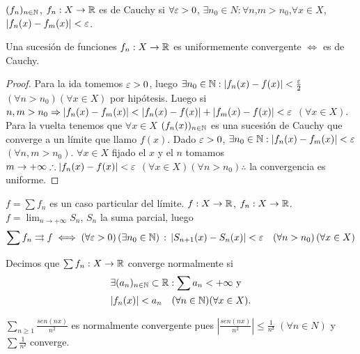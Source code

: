 \begin{definition}
  $(f_n)_{n \in \mathbb{N}}$, $f_n: X \to \mathbb{R}$ es de Cauchy si $\forall \varepsilon > 0$, $\exists n_0 \in N : \forall n$,$m > n_0$,$\forall x \in X$, $|f_n(x) - f_m(x)| < \varepsilon$.
\end{definition}

\clearpage

\begin{theorem}
  Una sucesión de funciones $f_n : X \to \mathbb{R}$ es uniformemente convergente $\iff$ es de Cauchy.
  \begin{proof}
    Para la ida tomemos $\varepsilon > 0$, luego $\exists n_0 \in \mathbb{N} : |f_n(x) - f(x)| < \frac{\varepsilon}{2}$ $(\forall n > n_0)(\forall x \in X)$ por hipótesis. Luego si $n, m > n_0 \Rightarrow |f_n(x) - f_m(x)| < |f_n(x) - f(x)| + |f_m(x) - f(x)| < \varepsilon$ $(\forall x \in X)$. \\
    Para la vuelta tenemos que $\forall x \in X$ $(f_n(x))_{n \in \mathbb{N}}$ es una sucesión de Cauchy que converge a un límite que llamo $f(x)$. Dado $\varepsilon > 0$, $\exists n_0 \in \mathbb{N} : |f_n(x) - f_m(x)| < \varepsilon$ $(\forall n, m > n_0)$. $\forall x \in X$ fijado el $x$ y el $n$ tomamos $m \to +\infty \therefore |f_n(x) - f(x)| < \varepsilon$ $(\forall x \in X)(\forall n > n_0) \therefore$ la convergencia es uniforme.
  \end{proof}
\end{theorem}

$f = \sum f_n$ es un caso particular del límite.
$f : X \to \mathbb{R}$, $f_n: X \to \mathbb{R}$. $f = \lim_{n \to +\infty} S_n$, $S_n$ la suma parcial, luego
\begin{align*}
  \sum f_n \rightrightarrows f \iff (\forall \varepsilon > 0) \, (\exists n_0 \in \mathbb{N}) \, : \, |S_{n+1}(x) - S_n(x)| < \varepsilon \quad (\forall n > n_0) \, (\forall x \in X)
\end{align*}

\begin{definition}
  Decimos que $\sum f_n: X \to \mathbb{R}$ converge normalmente si
  \begin{align*}
     & \exists (a_n)_{n \in \mathbb{N}} \subset \mathbb{R} : \sum a_n < +\infty \text{ y } \\
     & |f_n(x)| < a_n \quad (\forall n \in \mathbb{N})(\forall x \in X).
  \end{align*}
\end{definition}

\begin{eg}
  $\sum_{n \geq 1} \frac{sen(nx)}{n^2}$ es normalmente convergente pues $|\frac{sen(nx)}{n^2}| \leq \frac{1}{n²}$ $(\forall n \in N)$ y $\sum \frac{1}{n²}$ converge.
\end{eg}

